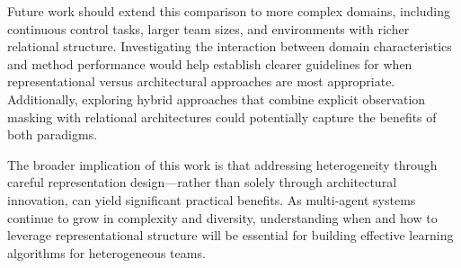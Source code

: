 Future work should extend this comparison to more complex domains, 
including continuous control tasks, larger team sizes, and 
environments with richer relational structure. Investigating the 
interaction between domain characteristics and method performance 
would help establish clearer guidelines for when representational 
versus architectural approaches are most appropriate. Additionally, 
exploring hybrid approaches that combine explicit observation masking 
with relational architectures could potentially capture the benefits 
of both paradigms.

The broader implication of this work is that addressing heterogeneity through 
careful representation design—rather than solely through architectural innovation, 
can yield significant practical benefits. As multi-agent systems continue to 
grow in complexity and diversity, understanding when and how to leverage 
representational structure will be essential for building effective learning 
algorithms for heterogeneous teams.